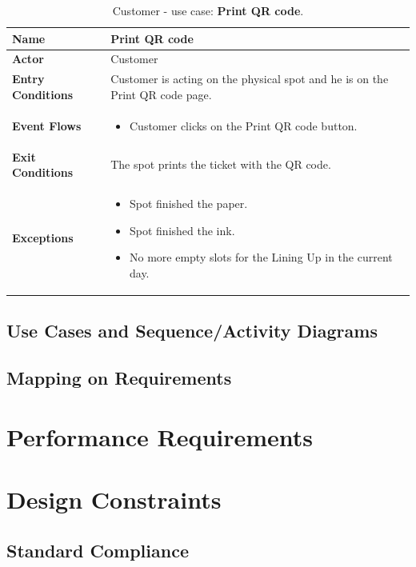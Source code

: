 \begin{table}[h!]
\centering
\begin{tabular}{| m{} | m{} |} 
	\hline
	\textbf{Name} & Print QR code \\ 
	\hline
	\textbf{Actor} & Customer \\ 
	\hline
	\textbf{Entry Conditions} & Customer is acting on the physical spot and he is on the Print QR code page. \\ 
	\hline
	\textbf{Event Flows} &
	\begin{itemize}
	\item Customer clicks on the Print QR code button.
	\end{itemize} \\ 
	\hline
	\textbf{Exit Conditions} & The spot prints the ticket with the QR code. \\ 
	\hline
	\textbf{Exceptions} &
	\begin{itemize}
	\item Spot finished the paper.
	\item Spot finished the ink.
	\item No more empty slots for the Lining Up in the current day.
	\end{itemize} \\ 
	\hline
\end{tabular}
\caption{Customer - use case: \textbf{Print QR code}.}
\label{tableLogIn}
\end{table}


\subsection{Use Cases and Sequence/Activity Diagrams}
\subsection{Mapping on Requirements}

\section{Performance Requirements}

\section{Design Constraints}

\subsection{Standard Compliance}
